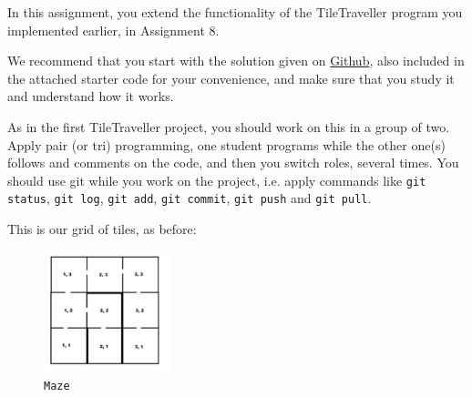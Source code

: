 
In this assignment, you extend the functionality of the TileTraveller program you implemented earlier, in Assignment 8.

We recommend that you start with the solution given on
\href{https://github.com/reykjavik-university/2023-3-T-111-PROG/blob/main/assignments/08_tile_traveller/a08p01tiletraveller/solution_code.py}{Github},
also included in the attached starter code for your convenience,
and make sure that you study it and understand how it works.

As in the first TileTraveller project, you should work on this in a group of two.
Apply pair (or tri) programming, one student programs while the other one(s) follows and comments on the code,
and then you switch roles, several times.
You should use git while you work on the project,
i.e. apply commands like
\texttt{git status},
\texttt{git log},
\texttt{git add},
\texttt{git commit},
\texttt{git push} and
\texttt{git pull}.

This is our grid of tiles, as before:

\begin{figure}[h]
    \centering
    \includegraphics[width=0.33\textwidth]{grid}
    \caption{\texttt{Maze}}
\end{figure}
